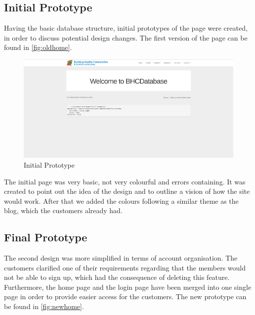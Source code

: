 \documentclass{l3proj}
\begin{document}
\subsection{Initial Prototype}
\label{sec:prototype1}

Having the basic database structure, initial prototypes of the page were created, in order to discuss potential design changes. The first version of the page can be found in \autoref{fig:oldhome}.

\begin{figure}[ht]
\centerline{\includegraphics[width=\textwidth, height=\textheight, keepaspectratio]{oldhome.png}}
\caption{Initial Prototype}
\label{fig:oldhome}
\end{figure}

The initial page was very basic, not very colourful and errors containing. It was created to point out the idea of the design and to outline a vision of how the site would work. After that we added the colours following a similar theme as the blog, which the customers already had.

\subsection{Final Prototype}
\label{sec:prototype2}

The second design was more simplified in terms of account organisation. The customers clarified one of their requirements regarding that the members would not be able to sign up, which had the consequence of deleting this feature. Furthermore, the home page and the login page have been merged into one single page in order to provide easier access for the customers. The new prototype can be found in \autoref{fig:newhome}.
\end{document}
